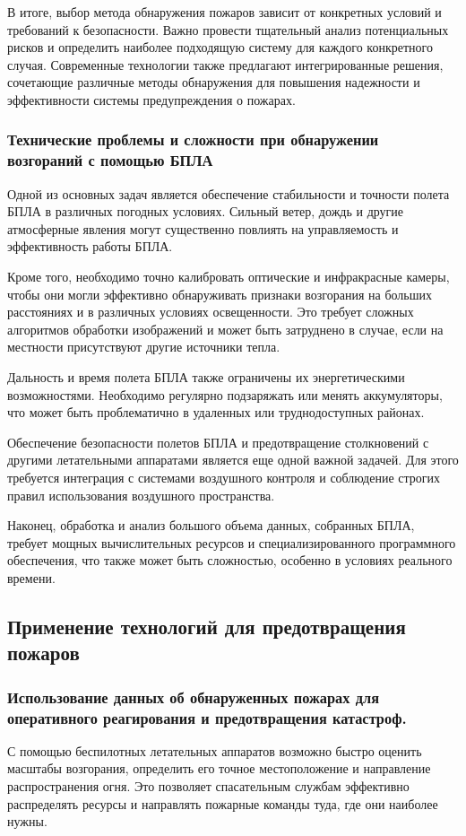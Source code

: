 В итоге, выбор метода обнаружения пожаров зависит от конкретных условий и требований к безопасности. Важно провести тщательный анализ потенциальных рисков и определить наиболее подходящую систему для каждого конкретного случая. Современные технологии также предлагают интегрированные решения, сочетающие различные методы обнаружения для повышения надежности и эффективности системы предупреждения о пожарах.
\subsubsection{Технические проблемы и сложности при обнаружении возгораний с помощью БПЛА}
Одной из основных задач является обеспечение стабильности и точности полета БПЛА в различных погодных условиях. Сильный ветер, дождь и другие атмосферные явления могут существенно повлиять на управляемость и эффективность работы БПЛА.

Кроме того, необходимо точно калибровать оптические и инфракрасные камеры, чтобы они могли эффективно обнаруживать признаки возгорания на больших расстояниях и в различных условиях освещенности. Это требует сложных алгоритмов обработки изображений и может быть затруднено в случае, если на местности присутствуют другие источники тепла.

Дальность и время полета БПЛА также ограничены их энергетическими возможностями. Необходимо регулярно подзаряжать или менять аккумуляторы, что может быть проблематично в удаленных или труднодоступных районах.

Обеспечение безопасности полетов БПЛА и предотвращение столкновений с другими летательными аппаратами является еще одной важной задачей. Для этого требуется интеграция с системами воздушного контроля и соблюдение строгих правил использования воздушного пространства.

Наконец, обработка и анализ большого объема данных, собранных БПЛА, требует мощных вычислительных ресурсов и специализированного программного обеспечения, что также может быть сложностью, особенно в условиях реального времени.
\subsection{Применение технологий для предотвращения пожаров}
\subsubsection{Использование данных об обнаруженных пожарах для оперативного реагирования и предотвращения катастроф.}
С помощью беспилотных летательных аппаратов возможно быстро оценить масштабы возгорания, определить его точное местоположение и направление распространения огня. Это позволяет спасательным службам эффективно распределять ресурсы и направлять пожарные команды туда, где они наиболее нужны.

